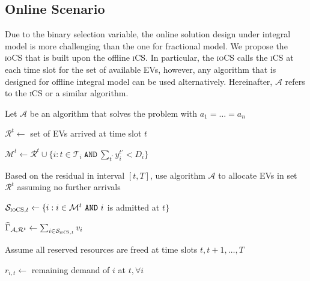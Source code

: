 \documentclass[journal]{IEEEtran}
\newcommand{\ics}{\textsc{iCS}\xspace}
\newcommand{\iocs}{\textsc{ioCS}\xspace}
\begin{document}
	
\subsection{Online Scenario}
\label{sec:onlineint}
Due to the binary selection variable, the online solution design under integral model is more challenging than the one for fractional model. We propose the \iocs that is built upon the offline \ics. In particular, the \iocs calls the \ics at each time slot for the set of available EVs, however, any algorithm that is designed for offline integral model can be used alternatively. Hereinafter, $\mathcal{A}$ refers to the \ics or a similar algorithm.

\vspace{-4mm}
\begin{algorithm}%
\footnotesize
\caption{\iocs: $\forall t\in \{1,2,\dots ,T\}$}
\label{alg:iocs}
\DontPrintSemicolon 


\BlankLine

Let $\mathcal{A}$ be an algorithm that solves the problem with $a_1=\dots =a_n$

$\mathcal{R}^t\leftarrow$ set of EVs arrived at time slot $t$

$\mathcal{M}^t\leftarrow \mathcal{R}^t\cup \{i: t\in\mathcal{T}_i\ \texttt{AND}\ \sum_{t^\prime}y_{i}^{t'}<D_i\}$ 


Based on the residual in interval $[t,T]$, use algorithm $\mathcal{A}$ to allocate EVs in set $\mathcal{R}^t$ assuming no further arrivals 

$\mathcal{S}_{\iocs,t}\leftarrow\{i:i\in\mathcal{M}^t\ \texttt{AND}\ i$ is admitted at $t\}$

$\widehat{\Gamma}_{\mathcal{A},\mathcal{R}^t}\leftarrow \sum_{i\in\mathcal{S}_{\iocs,t}}v_i$

Assume all reserved resources are freed at time slots $t, t+1, \dots, T$



$r_{i,t}\leftarrow$ remaining demand of $i$ at $t, \forall i$



\end{algorithm}
\end{document}
